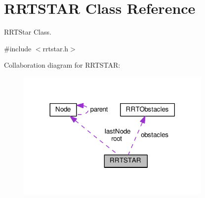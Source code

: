 \hypertarget{classRRTSTAR}{}\section{R\+R\+T\+S\+T\+AR Class Reference}
\label{classRRTSTAR}


R\+R\+T\+Star Class.  




{\ttfamily \#include $<$rrtstar.\+h$>$}



Collaboration diagram for R\+R\+T\+S\+T\+AR\+:\nopagebreak
\begin{figure}[H]
\begin{center}
\leavevmode
\includegraphics[width=269pt]{classRRTSTAR__coll__graph}
\end{center}
\end{figure}
